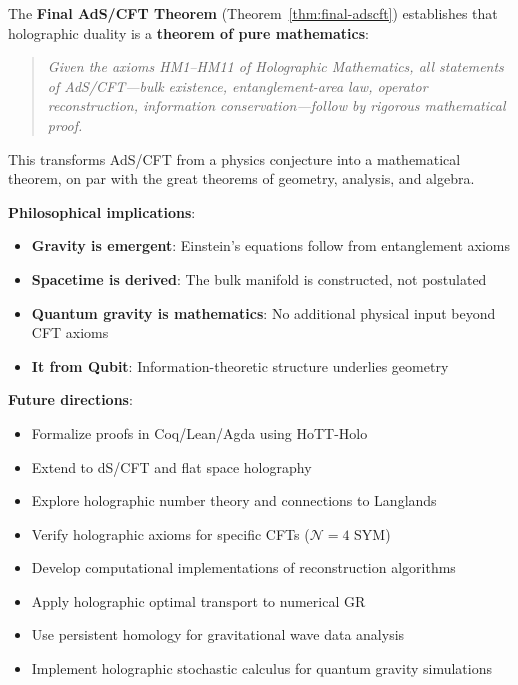 \documentclass[12pt,a4paper]{article}
\begin{document}
The \textbf{Final AdS/CFT Theorem} (Theorem~\ref{thm:final-adscft}) establishes that holographic duality is a \textbf{theorem of pure mathematics}:
\begin{quote}
\emph{Given the axioms HM1--HM11 of Holographic Mathematics, all statements of AdS/CFT---bulk existence, entanglement-area law, operator reconstruction, information conservation---follow by rigorous mathematical proof.}
\end{quote}

This transforms AdS/CFT from a physics conjecture into a mathematical theorem, on par with the great theorems of geometry, analysis, and algebra.

\textbf{Philosophical implications}:
\begin{itemize}
    \item \textbf{Gravity is emergent}: Einstein's equations follow from entanglement axioms
    \item \textbf{Spacetime is derived}: The bulk manifold is constructed, not postulated
    \item \textbf{Quantum gravity is mathematics}: No additional physical input beyond CFT axioms
    \item \textbf{It from Qubit}: Information-theoretic structure underlies geometry
\end{itemize}

\textbf{Future directions}:
\begin{itemize}
    \item Formalize proofs in Coq/Lean/Agda using HoTT-Holo
    \item Extend to dS/CFT and flat space holography
    \item Explore holographic number theory and connections to Langlands
    \item Verify holographic axioms for specific CFTs ($\mathcal{N}=4$ SYM)
    \item Develop computational implementations of reconstruction algorithms
    \item Apply holographic optimal transport to numerical GR
    \item Use persistent homology for gravitational wave data analysis
    \item Implement holographic stochastic calculus for quantum gravity simulations
\end{itemize}
\end{document}
